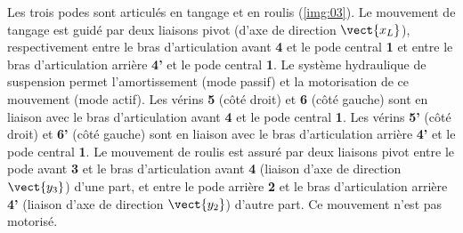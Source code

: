Les trois podes sont articulés en tangage et en roulis (\autoref{img:03}). Le mouvement de tangage est guidé par deux liaisons pivot (d’axe de direction  $\vect{x_L}$), respectivement entre le bras d’articulation avant \textbf{4} et le pode central \textbf{1} et entre le bras d’articulation arrière \textbf{4’} et le pode central \textbf{1}. Le système hydraulique de suspension permet l’amortissement (mode passif) et la motorisation de ce mouvement (mode actif). Les vérins \textbf{5} (côté droit) et \textbf{6} (côté gauche) sont en liaison avec le bras d’articulation avant \textbf{4} et le pode central \textbf{1}. Les vérins \textbf{5’} (côté droit) et \textbf{6’} (côté gauche) sont en liaison avec le bras d’articulation arrière \textbf{4’} et le pode central \textbf{1}. Le mouvement de roulis est assuré par deux liaisons pivot entre le pode avant \textbf{3} et le bras d’articulation avant \textbf{4} (liaison d’axe de direction $\vect{y_3}$) d’une part, et entre le pode arrière \textbf{2} et le bras d’articulation arrière \textbf{4’}  (liaison d’axe de direction $\vect{y_2}$) d’autre part. Ce mouvement n’est pas motorisé. 


